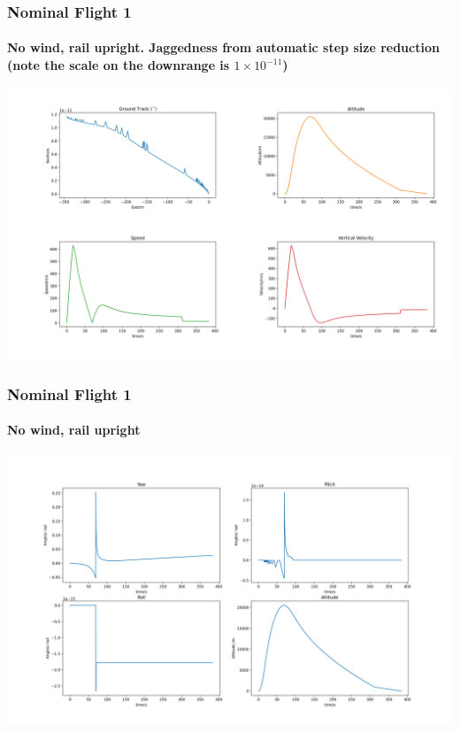\documentclass{beamer}
\begin{document}
    \begin{frame}
        \frametitle{Nominal Flight 1}
        \framesubtitle{No wind, rail upright. Jaggedness from automatic step size reduction (note the scale on the downrange is $1\times10^{-11}$)}
        \begin{center}
            \includegraphics[width=\textwidth]{images/example1a.png}
        \end{center}
    \end{frame}
    \begin{frame}
        \frametitle{Nominal Flight 1}
        \framesubtitle{No wind, rail upright}
        \begin{center}
            \includegraphics[width=\textwidth]{images/example1b.png}
        \end{center}
    \end{frame}
\end{document}
